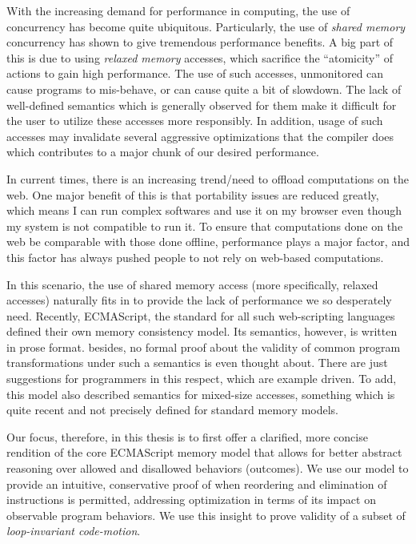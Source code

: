      
With the increasing demand for performance in computing, the use of concurrency has become quite ubiquitous. 
Particularly, the use of \textit{shared memory} concurrency has shown to give tremendous performance benefits. 
A big part of this is due to using \textit{relaxed memory} accesses, which sacrifice the ``atomicity'' of actions to gain high performance. 
The use of such accesses, unmonitored can cause programs to mis-behave, or can cause quite a bit of slowdown. 
The lack of well-defined semantics which is generally observed for them make it difficult for the user to utilize these accesses more responsibly.
In addition, usage of such accesses may invalidate several aggressive optimizations that the compiler does which contributes to a major chunk of our desired performance.

In current times, there is an increasing trend/need to offload computations on the web. 
One major benefit of this is that portability issues are reduced greatly, which means I can run complex softwares and use it on my browser even though my system is not compatible to run it. 
To ensure that computations done on the web be comparable with those done offline, performance plays a major factor, and this factor has always pushed people to not rely on web-based computations. 

In this scenario, the use of shared memory access (more specifically, relaxed accesses) naturally fits in to provide the lack of performance we so desperately need.
Recently, ECMAScript, the standard for all such web-scripting languages defined their own memory consistency model.
Its semantics, however, is written in prose format. 
besides, no formal proof about the validity of common program transformations under such a semantics is even thought about.
There are just suggestions for programmers in this respect, which are example driven.
To add, this model also described semantics for mixed-size accesses, something which is quite recent and not precisely defined for standard memory models. 

Our focus, therefore, in this thesis is to first offer a clarified, more concise rendition of the core ECMAScript memory model that allows for better abstract reasoning over allowed and disallowed behaviors (outcomes). 
We use our model to provide an intuitive, conservative proof of when reordering and elimination of instructions is permitted, addressing optimization in terms of its impact on observable program behaviors. 
We use this insight to prove validity of a subset of \textit{loop-invariant code-motion}. 

